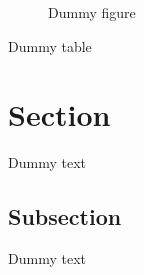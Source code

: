 \documentclass{article}
\begin{document}
\tableofcontents
\newpage

\begin{figure}
  \caption{Dummy figure}
\end{figure}
\begin{table}
  \caption{Dummy table}
\end{table}

\section{Section}

Dummy text

\subsection{Subsection}

Dummy text

\begin{appendix}
  \listoffigures
  \listoftables
\end{appendix}
\end{document}

